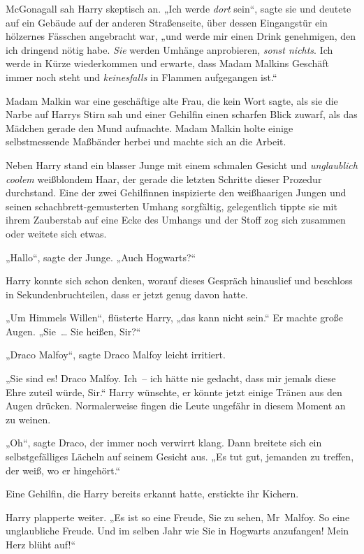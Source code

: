 {McGonagall sah Harry skeptisch an. „Ich werde \emph{dort} sein“, sagte sie und deutete auf ein Gebäude auf der anderen Straßenseite, über dessen Eingangstür ein hölzernes Fässchen angebracht war, „und werde mir einen Drink genehmigen, den ich dringend nötig habe. \emph{Sie} werden Umhänge anprobieren, \emph{sonst nichts}. Ich werde in Kürze wiederkommen und erwarte, dass Madam Malkins Geschäft immer noch steht und \emph{keinesfalls} in Flammen aufgegangen ist.“

Madam Malkin war eine geschäftige alte Frau, die kein Wort sagte, als sie die Narbe auf Harrys Stirn sah und einer Gehilfin einen scharfen Blick zuwarf, als das Mädchen gerade den Mund aufmachte. Madam Malkin holte einige selbstmessende Maßbänder herbei und machte sich an die Arbeit.

Neben Harry stand ein blasser Junge mit einem schmalen Gesicht und \emph{unglaublich coolem} weißblondem Haar, der gerade die letzten Schritte dieser Prozedur durchstand. Eine der zwei Gehilfinnen inspizierte den weißhaarigen Jungen und seinen schachbrett-gemusterten Umhang sorgfältig, gelegentlich tippte sie mit ihrem Zauberstab auf eine Ecke des Umhangs und der Stoff zog sich zusammen oder weitete sich etwas.

„Hallo“, sagte der Junge. „Auch Hogwarts?“

Harry konnte sich schon denken, worauf dieses Gespräch hinauslief und beschloss in Sekundenbruchteilen, dass er jetzt genug davon hatte.

„Um Himmels Willen“, flüsterte Harry, „das kann nicht sein.“ Er machte große Augen. „Sie~… Sie heißen, Sir?“

„Draco Malfoy“, sagte Draco Malfoy leicht irritiert.

„Sie sind es! Draco Malfoy. Ich~-- ich hätte nie gedacht, dass mir jemals diese Ehre zuteil würde, Sir.“ Harry wünschte, er könnte jetzt einige Tränen aus den Augen drücken. Normalerweise fingen die Leute ungefähr in diesem Moment an zu weinen.

„Oh“, sagte Draco, der immer noch verwirrt klang. Dann breitete sich ein selbstgefälliges Lächeln auf seinem Gesicht aus. „Es tut gut, jemanden zu treffen, der weiß, wo er hingehört.“

Eine Gehilfin, die Harry bereits erkannt hatte, erstickte ihr Kichern.

Harry plapperte weiter. „Es ist so eine Freude, Sie zu sehen, Mr~Malfoy. So eine unglaubliche Freude. Und im selben Jahr wie Sie in Hogwarts anzufangen! Mein Herz blüht auf!“

}
